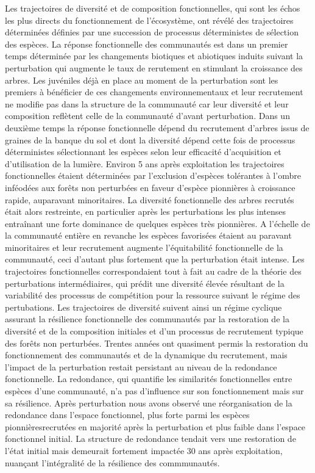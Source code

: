 \documentclass[
  11pt,
  french,
  A4paper,
  extrafontsizes,onecolumn,openright
  ]{memoir}
\begin{document}
Les trajectoires de diversité et de composition fonctionnelles, qui sont
les échos les plus directs du fonctionnement de l'écosystème, ont révélé
des trajectoires déterminées définies par une succession de processus
déterministes de sélection des espèces. La réponse fonctionnelle des
communautés est dans un premier temps déterminée par les changements
biotiques et abiotiques induits suivant la perturbation qui augmente le
taux de rerutement en stimulant la croissance des arbres. Les juvéniles
déjà en place au moment de la perturbation sont les premiers à
bénéficier de ces changements environnementaux et leur recrutement ne
modifie pas dans la structure de la communauté car leur diversité et
leur composition reflètent celle de la communauté d'avant perturbation.
Dans un deuxième temps la réponse fonctionnelle dépend du recrutement
d'arbres issus de graines de la banque du sol et dont la diversité
dépend cette fois de processus déterministes sélectionnant les espèces
selon leur efficacité d'acquisition et d'utilisation de la lumière.
Environ 5 ans après exploitation les trajectoires fonctionnelles étaient
déterminées par l'exclusion d'espèces tolérantes à l'ombre inféodées aux
forêts non perturbées en faveur d'espèce pionnières à croissance rapide,
auparavant minoritaires. La diversité fonctionnelle des arbres recrutés
était alors restreinte, en particulier après les perturbations les plus
intenses entraînant une forte dominance de quelques espèces très
pionnières. A l'échelle de la communauté entière en revanche les espèces
favorisées étaient au paravant minoritaires et leur recrutement augmente
l'équitabilité fonctionnelle de la communauté, ceci d'autant plus
fortement que la perturbation était intense. Les trajectoires
fonctionnelles correspondaient tout à fait au cadre de la théorie des
perturbations intermédiaires, qui prédit une diversité élevée résultant
de la variabilité des processus de compétition pour la ressource suivant
le régime des pertubations. Les trajectoires de diversité suivent ainsi
un régime cyclique assurant la résilience fonctionnelle des communautés
par la restoration de la diversité et de la composition initiales et
d'un processus de recrutement typique des forêts non perturbées. Trentes
années ont quasiment permis la restoration du fonctionnement des
communautés et de la dynamique du recrutement, mais l'impact de la
perturbation restait persistant au niveau de la redondance
fonctionnelle. La redondance, qui quantifie les similarités
fonctionnelles entre espèces d'une communauté, n'a pas d'influence sur
son fonctionnement mais sur sa résilience. Après perturbation nous avons
observé une réorganisation de la redondance dans l'espace fonctionnel,
plus forte parmi les espèces pionnièresrecrutées en majorité après la
perturbation et plus faible dans l'espace fonctionnel initial. La
structure de redondance tendait vers une restoration de l'état initial
mais demeurait fortement impactée 30 ans après exploitation, nuançant
l'intégralité de la résilience des commmunautés.
\end{document}

